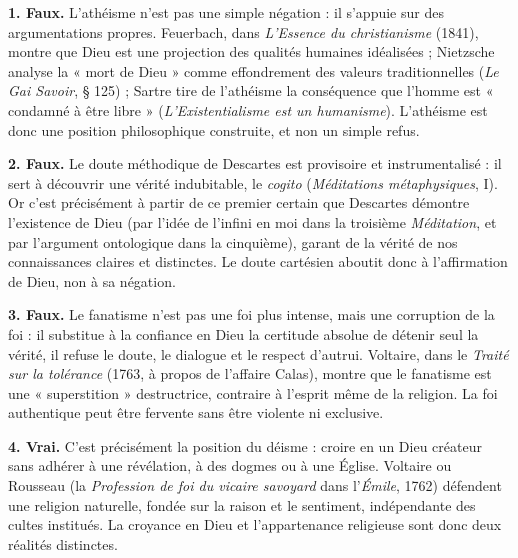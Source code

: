 \documentclass[11pt]{article}
\begin{document}
\begin{corrige}
\textbf{1. Faux.} L'athéisme n'est pas une simple négation : il s'appuie sur des argumentations propres. Feuerbach, dans \emph{L'Essence du christianisme} (1841), montre que Dieu est une projection des qualités humaines idéalisées ; Nietzsche analyse la « mort de Dieu » comme effondrement des valeurs traditionnelles (\emph{Le Gai Savoir}, § 125) ; Sartre tire de l'athéisme la conséquence que l'homme est « condamné à être libre » (\emph{L'Existentialisme est un humanisme}). L'athéisme est donc une position philosophique construite, et non un simple refus.

\textbf{2. Faux.} Le doute méthodique de Descartes est provisoire et instrumentalisé : il sert à découvrir une vérité indubitable, le \emph{cogito} (\emph{Méditations métaphysiques}, I). Or c'est précisément à partir de ce premier certain que Descartes démontre l'existence de Dieu (par l'idée de l'infini en moi dans la troisième \emph{Méditation}, et par l'argument ontologique dans la cinquième), garant de la vérité de nos connaissances claires et distinctes. Le doute cartésien aboutit donc à l'affirmation de Dieu, non à sa négation.

\textbf{3. Faux.} Le fanatisme n'est pas une foi plus intense, mais une corruption de la foi : il substitue à la confiance en Dieu la certitude absolue de détenir seul la vérité, il refuse le doute, le dialogue et le respect d'autrui. Voltaire, dans le \emph{Traité sur la tolérance} (1763, à propos de l'affaire Calas), montre que le fanatisme est une « superstition » destructrice, contraire à l'esprit même de la religion. La foi authentique peut être fervente sans être violente ni exclusive.

\textbf{4. Vrai.} C'est précisément la position du déisme : croire en un Dieu créateur sans adhérer à une révélation, à des dogmes ou à une Église. Voltaire ou Rousseau (la \emph{Profession de foi du vicaire savoyard} dans l'\emph{Émile}, 1762) défendent une religion naturelle, fondée sur la raison et le sentiment, indépendante des cultes institués. La croyance en Dieu et l'appartenance religieuse sont donc deux réalités distinctes.
\end{corrige}
\end{document}
